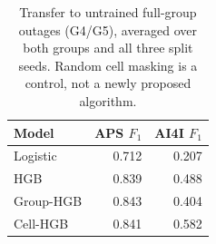 \begin{table}[t]\centering\caption{Transfer to untrained full-group outages (G4/G5), averaged over both groups and all three split seeds. Random cell masking is a control, not a newly proposed algorithm.}\label{tab:transfer}\small
\begin{tabular}{lrr}\hline
Model & APS $F_1$ & AI4I $F_1$\\\hline
Logistic & 0.712 & 0.207\\
HGB & 0.839 & 0.488\\
Group-HGB & 0.843 & 0.404\\
Cell-HGB & 0.841 & 0.582\\
\hline\end{tabular}\end{table}
